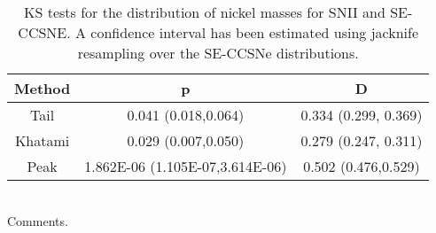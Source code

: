\begin{table*}

\caption{KS tests for the distribution of nickel masses for SNII and SE-CCSNE. A confidence interval has been estimated using jacknife resampling over the SE-CCSNe distributions.\label{tab:table}}

\begin{tabular}{ccc}
\hline
{Method} & {p}  & {D} \\
\hline
Tail & 0.041  (0.018,0.064) & 0.334 (0.299, 0.369) \\
Khatami & 0.029  (0.007,0.050) & 0.279 (0.247, 0.311) \\
Peak & 1.862E-06  (1.105E-07,3.614E-06) & 0.502 (0.476,0.529) \\

\end{tabular}\\
Comments.
\end{table*}
